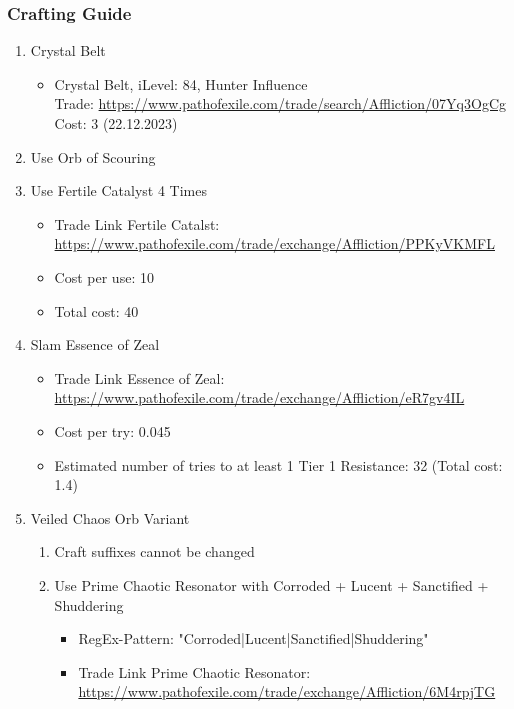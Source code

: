\subsubsection{Crafting Guide}
\begin{enumerate}
	\item Crystal Belt
	\begin{itemize}
		\item Crystal Belt, iLevel: 84, Hunter Influence\\
		Trade: \url{https://www.pathofexile.com/trade/search/Affliction/07Yq3OgCg}\\
		Cost: \SI{3}{\Divine} (22.12.2023)
	\end{itemize}
	\item Use Orb of Scouring\\
	\item Use Fertile Catalyst 4 Times\\
	\begin{itemize}
		\item Trade Link Fertile Catalst: \url{https://www.pathofexile.com/trade/exchange/Affliction/PPKyVKMFL}
		\item Cost per use: \SI{10}{\Chaos}
		\item Total cost: \SI{40}{\Chaos}
	\end{itemize}
	\item Slam Essence of Zeal\\
	\begin{itemize}
		\item Trade Link Essence of Zeal: \url{https://www.pathofexile.com/trade/exchange/Affliction/eR7gv4IL}
		\item Cost per try: \SI{0.045}{\Divine}
		\item Estimated number of tries to at least 1 Tier 1 Resistance: 32 (Total cost: \SI{1.4}{\Divine})
	\end{itemize}
	\item Veiled Chaos Orb Variant
	\begin{enumerate}
		\item Craft suffixes cannot be changed
		\item Use Prime Chaotic Resonator with Corroded + Lucent + Sanctified + Shuddering\\
		\begin{itemize}
			\item RegEx-Pattern: "Corroded|Lucent|Sanctified|Shuddering"
			\item Trade Link Prime Chaotic Resonator: \url{https://www.pathofexile.com/trade/exchange/Affliction/6M4rpjTG}

\end{itemize}
\end{enumerate}
\end{enumerate}
